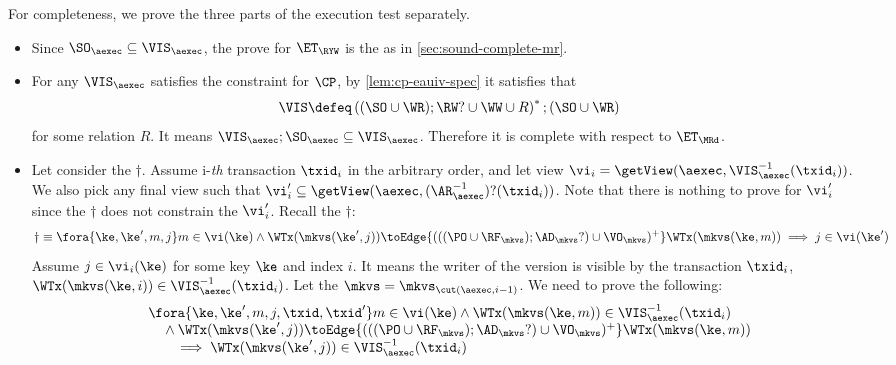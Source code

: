     
For completeness, we prove the three parts of the execution test separately.
\begin{itemize}
\item Since \( \SO_\aexec \subseteq \VIS_\aexec  \), the prove for \( \ET_\RYW \) is the as in \cref{sec:sound-complete-mr}.
\item For any \( \VIS_\aexec \)  satisfies the constraint for \( \CP \), by \cref{lem:cp-eauiv-spec} it satisfies that 
\[
    \VIS \defeq \left( (\SO \cup \WR ) ; \RW? \cup \WW \cup R \right)^* ; (\SO \cup \WR )
\]
for some relation \( R \).
It means \( \VIS_\aexec ; \SO_\aexec \subseteq \VIS_\aexec \).
Therefore it is complete with respect to \( \ET_\MRd \).

\item Let consider the \( \dagger \).
Assume i-\emph{th} transaction \( \txid_i \) in the arbitrary order,
and let view \( \vi_{i} = \getView(\aexec, \VIS^{-1}_{\aexec}(\txid_{i}) ) \).
We also pick any final view such that \( \vi'_{i} \subseteq \getView(\aexec, (\AR^{-1}_{\aexec})?(\txid_{i}) ) \).
Note that there is nothing to prove for \( \vi'_i \) since the \( \dagger \) does not constrain the \( \vi'_i \).
Recall the \( \dagger \):
\[
\dagger  \equiv 
        \fora{\ke, \ke', m, j}
             m \in \vi(\ke)  \wedge \WTx(\mkvs(\ke', j)) \toEdge{(((\PO \cup \RF_{\mkvs}) ; \AD_{\mkvs}?) \cup \VO_{\mkvs})^{+}} \WTx(\mkvs(\ke, m))
         \implies j \in \vi(\ke')  
\]
Assume \( j \in \vi_i(\ke) \) for some key \(\ke \) and index \( i \).
It means the writer of the version is visible by the transaction \( \txid_i\),
\ie \( \WTx(\mkvs(\ke,i)) \in \VIS^{-1}_{\aexec}(\txid_{i}) \).
Let the \( \mkvs = \mkvs_{\cut(\aexec, i-1)} \).
We need to prove the following:
\begin{gather}
    \label{equ:cp-complete-arvis}
    \begin{array}{@{}l@{}}
        \fora{\ke, \ke', m, j, \txid, \txid'} 
        m \in \vi(\ke) 
        \land \WTx(\mkvs(\ke,m)) \in \VIS_\aexec^{-1}(\txid_i) \\
        \quad {} \land \WTx(\mkvs(\ke', j)) \toEdge{(((\PO \cup \RF_{\mkvs}) ; \AD_{\mkvs}?) \cup \VO_{\mkvs})^{+}} \WTx(\mkvs(\ke, m)) \\
            \qquad \implies \WTx(\mkvs(\ke',j)) \in \VIS_\aexec^{-1}(\txid_i)
    \end{array}
\end{gather}

\end{itemize}
